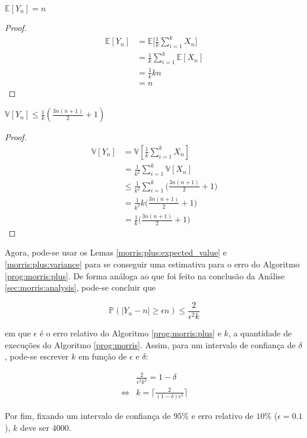 \begin{lemma}\label{morris:plus:expected_value}
  $\mathbb{E}[Y_n] = n$
\end{lemma}

\begin{proof}

\begin{align*}
  \mathbb{E}[Y_n] 
    &= \mathbb{E} \Big[ \frac{1}{k} \sum_{i=1}^{k} X_n \Big]  \\
    &= \frac{1}{k} \sum_{i=1}^{k} \mathbb{E}[X_n] \\
    &= \frac{1}{k} k n  \\
    &= n
\end{align*}

\end{proof}

\begin{lemma}\label{morris:plus:variance}
  $\mathbb{V}[Y_n] \leq \frac{1}{k} ( \frac{3n(n+1)}{2} + 1 )$
\end{lemma}

\begin{proof}
  
\begin{align*}
  \mathbb{V}[Y_n] 
    &= \mathbb{V}[\frac{1}{k} \sum_{i=1}^{k} X_n] \\
    &= \frac{1}{k^2} \sum_{i=1}^{k}\mathbb{V}[X_n]  \\
    &\leq \frac{1}{k^2} \sum_{i=1}^{k} \Big( \frac{3n(n+1)}{2} + 1 \Big)  \\
    &= \frac{1}{k^2} k \Big( \frac{3n(n+1)}{2} + 1 \Big)  \\
    &= \frac{1}{k} \Big( \frac{3n(n+1)}{2} + 1 \Big)
\end{align*}

\end{proof}

Agora, pode-se usar os Lemas \ref{morris:plus:expected_value} e \ref{morris:plus:variance} para se conseguir uma estimativa para o 
erro do Algoritmo \ref{prog:morris:plus}. De forma análoga ao que foi feito na conclusão da Análise \ref{sec:morris:analysis}, pode-se 
concluir que

\[ \mathbb{P}(|Y_n - n| \geq \epsilon n ) \leq \frac{2}{\epsilon^2 k}\]

em que $\epsilon$ é o erro relativo do Algoritmo \ref{prog:morris:plus} e $k$, a quantidade de execuções do Algoritmo \ref{prog:morris}.
Assim, para um intervalo de confiança de $\delta$, pode-se escrever $k$ em função de $\epsilon$ e $\delta$:

\begin{align*}
      &\frac{2}{\epsilon^2 k^2} = 1 - \delta \\
  \iff& k = \Bigg\lceil \frac{2}{(1 - \delta) \epsilon^2} \Bigg\rceil
\end{align*}

Por fim, fixando um intervalo de confiança de $95\%$ e erro relativo de $10\%$ ($\epsilon = 0.1$), $k$ deve ser $4000$.  

